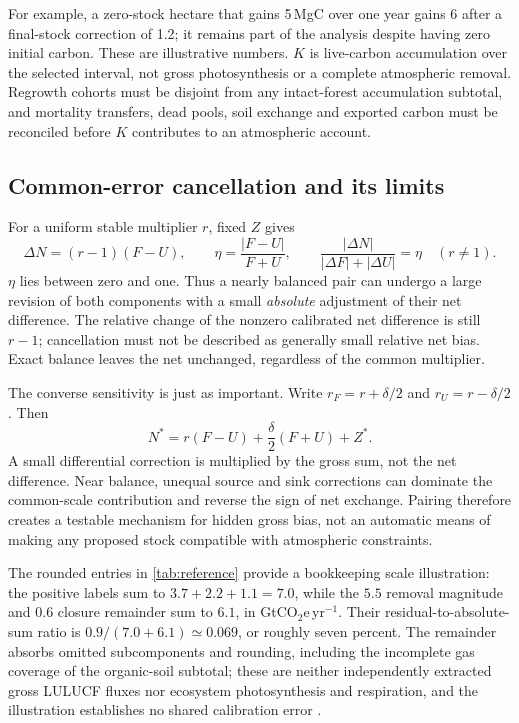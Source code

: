 \documentclass[11pt,a4paper]{article}
\newcommand{\COtwoe}{\ensuremath{\mathrm{CO}_2\mathrm{e}}}
\theoremstyle{remark}
\begin{document}
For example, a zero-stock hectare that gains 5\,MgC over one year gains 6 after a final-stock correction of 1.2; it remains part of the analysis despite having zero initial carbon. These are illustrative numbers. $K$ is live-carbon accumulation over the selected interval, not gross photosynthesis or a complete atmospheric removal. Regrowth cohorts must be disjoint from any intact-forest accumulation subtotal, and mortality transfers, dead pools, soil exchange and exported carbon must be reconciled before $K$ contributes to an atmospheric account.

\subsection{Common-error cancellation and its limits}
For a uniform stable multiplier $r$, fixed $Z$ gives
\begin{equation}
\Delta N=(r-1)(F-U),\qquad
\eta=\frac{|F-U|}{F+U},\qquad
\frac{|\Delta N|}{|\Delta F|+|\Delta U|}=\eta\quad(r\ne1).
\label{eq:cancellation}
\end{equation}
$\eta$ lies between zero and one. Thus a nearly balanced pair can undergo a large revision of both components with a small \emph{absolute} adjustment of their net difference. The relative change of the nonzero calibrated net difference is still $r-1$; cancellation must not be described as generally small relative net bias. Exact balance leaves the net unchanged, regardless of the common multiplier.

The converse sensitivity is just as important. Write $r_F=r+\delta/2$ and $r_U=r-\delta/2$. Then
\begin{equation}
N^*=r(F-U)+\frac{\delta}{2}(F+U)+Z^*.
\label{eq:differential}
\end{equation}
A small differential correction is multiplied by the gross sum, not the net difference. Near balance, unequal source and sink corrections can dominate the common-scale contribution and reverse the sign of net exchange. Pairing therefore creates a testable mechanism for hidden gross bias, not an automatic means of making any proposed stock compatible with atmospheric constraints.

The rounded entries in \cref{tab:reference} provide a bookkeeping scale illustration: the positive labels sum to $3.7+2.2+1.1=7.0$, while the $5.5$ removal magnitude and $0.6$ closure remainder sum to $6.1$, in Gt\COtwoe{}\,yr$^{-1}$. Their residual-to-absolute-sum ratio is $0.9/(7.0+6.1)\simeq0.069$, or roughly seven percent. The remainder absorbs omitted subcomponents and rounding, including the incomplete gas coverage of the organic-soil subtotal; these are neither independently extracted gross LULUCF fluxes nor ecosystem photosynthesis and respiration, and the illustration establishes no shared calibration error \citep{Crippa2026}.
\end{document}
